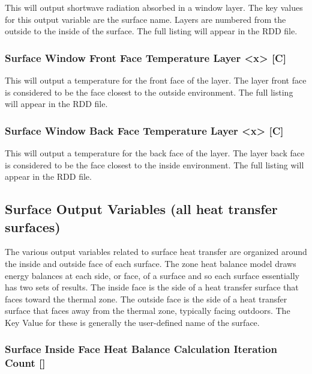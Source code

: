 This will output shortwave radiation absorbed in a window layer. The key values for this output variable are the surface name. Layers are numbered from the outside to the inside of the surface. The full listing will appear in the RDD file.

\subsubsection{Surface Window Front Face Temperature Layer \textless{}x\textgreater{} {[}C{]}}\label{surface-window-front-face-temperature-layer-x-c}

This will output a temperature for the front face of the layer. The layer front face is considered to be the face closest to the outside environment. The full listing will appear in the RDD file.

\subsubsection{Surface Window Back Face Temperature Layer \textless{}x\textgreater{} {[}C{]}}\label{surface-window-back-face-temperature-layer-x-c}

This will output a temperature for the back face of the layer. The layer back face is considered to be the face closest to the inside environment. The full listing will appear in the RDD file.

\subsection{Surface Output Variables (all heat transfer surfaces)}\label{surface-output-variables-all-heat-transfer-surfaces}

The various output variables related to surface heat transfer are organized around the inside and outside face of each surface. The zone heat balance model draws energy balances at each side, or face, of a surface and so each surface essentially has two sets of results. The inside face is the side of a heat transfer surface that faces toward the thermal zone. The outside face is the side of a heat transfer surface that faces away from the thermal zone, typically facing outdoors. The Key Value for these is generally the user-defined name of the surface.

\subsubsection{Surface Inside Face Heat Balance Calculation Iteration Count {[]}}\label{surface-inside-face-heat-balance-calculation-iteration-count}

